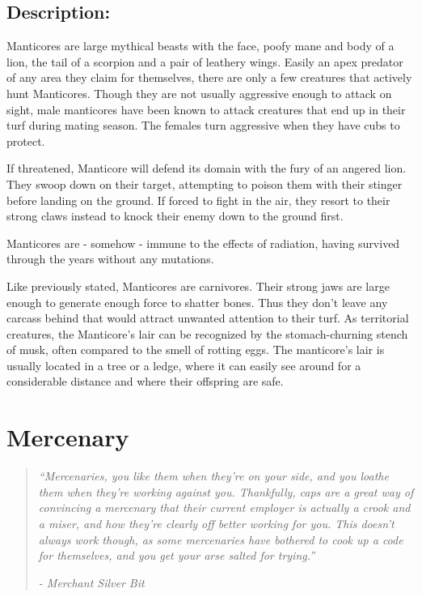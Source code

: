 \documentclass[11pt,a4paper,twocolumn]{book}
\begin{document}
	\subsection*{Description:}
	Manticores are large mythical beasts with the face, poofy mane and body of a lion, the tail of a scorpion and a pair of leathery wings. Easily an apex predator of any area they claim for themselves, there are only a few creatures that actively hunt Manticores. Though they are not usually aggressive enough to attack on sight, male manticores have been known to attack creatures that end up in their turf during mating season. The females turn aggressive when they have cubs to protect.
	
	If threatened, Manticore will defend its domain with the fury of an angered lion. They swoop down on their target, attempting to poison them with their stinger before landing on the ground. If forced to fight in the air, they resort to their strong claws instead to knock their enemy down to the ground first.
	
	Manticores are - somehow - immune to the effects of radiation, having survived through the years without any mutations. 
	
	Like previously stated, Manticores are carnivores. Their strong jaws are large enough to generate enough force to shatter bones. Thus they don't leave any carcass behind that would attract unwanted attention to their turf. As territorial creatures, the Manticore's lair can be recognized by the stomach-churning stench of musk, often compared to the smell of rotting eggs. The manticore's lair is usually located in a tree or a ledge, where it can easily see around for a considerable distance and where their offspring are safe.
	
	\clearpage
	
	\section*{Mercenary}
	\begin{quote}
		\emph{``Mercenaries, you like them when they're on your side, and you loathe them when they're working against you. Thankfully, caps are a great way of convincing a mercenary that their current employer is actually a crook and a miser, and how they're clearly off better working for you. This doesn't always work though, as some mercenaries have bothered to cook up a code for themselves, and you get your arse salted for trying.''}
		
		\emph{-	Merchant Silver Bit}
	\end{quote}
	
\end{document}
